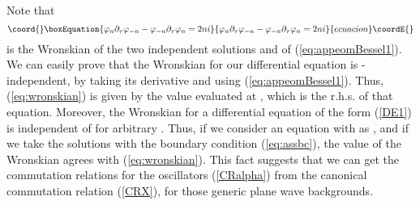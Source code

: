 \documentclass[a4paper,12pt]{article}
\begin{document}
Note that 
\begin{equation}\coord{}\boxEquation{
\varphi_{n}\partial_{\tau}
\varphi_{-n}-\varphi_{-n}\partial_{\tau}\varphi_{n}=2ni
\label{eq:wronskian}
}{
\varphi_{n}\partial_{\tau}
\varphi_{-n}-\varphi_{-n}\partial_{\tau}\varphi_{n}=2ni
}{ecuacion}\coordE{}\end{equation}
is the Wronskian of the two independent solutions
\coordHE{} and \coordHE{} of (\ref{eq:appeomBessel1}). 
We can easily prove that the Wronskian for our 
differential equation is \myHighlight{$\tau$}\coordHE{}-independent,
by taking its derivative and using (\ref{eq:appeomBessel1}).
Thus, (\ref{eq:wronskian}) is given by the value evaluated
at \myHighlight{$\tau\rightarrow \infty$}\coordHE{}, which is the r.h.s. of that
equation.
Moreover, the Wronskian for a differential equation of 
the form (\ref{DE1}) is independent of \myHighlight{$\tau$}\coordHE{} 
for arbitrary \coordHE{}. 
Thus, if we consider an equation with \coordHE{} as \myHighlight{$\tau\rightarrow\infty$}\coordHE{}, and if we take the 
solutions with the boundary condition (\ref{eq:assbc}), 
the value of the Wronskian agrees with (\ref{eq:wronskian}).
This fact suggests that we can get
the commutation relations for the oscillators 
(\ref{CRalpha}) from the canonical commutation
relation (\ref{CRX}), for those generic plane wave backgrounds.
\end{document}
